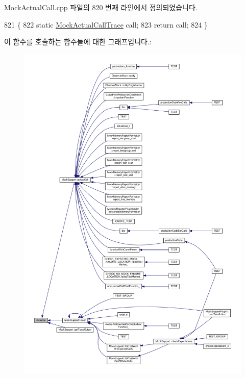 Mock\+Actual\+Call.\+cpp 파일의 820 번째 라인에서 정의되었습니다.


\begin{DoxyCode}
821 \{
822     \textcolor{keyword}{static} \hyperlink{class_mock_actual_call_trace}{MockActualCallTrace} call;
823     \textcolor{keywordflow}{return} call;
824 \}
\end{DoxyCode}


이 함수를 호출하는 함수들에 대한 그래프입니다.\+:
\nopagebreak
\begin{figure}[H]
\begin{center}
\leavevmode
\includegraphics[width=350pt]{class_mock_actual_call_trace_a78e0ad1856f39448ecd9d678621279c6_icgraph}
\end{center}
\end{figure}


